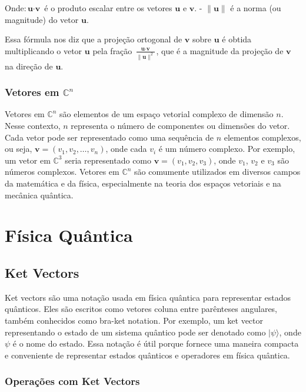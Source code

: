 \documentclass[12pt]{article}
\begin{document}
Onde:\(\textbf{u}  \cdot  \textbf{v} \) é o produto escalar entre os vetores \( \textbf{u} \) e \( \textbf{v} \).
- \( \| \textbf{u} \| \) é a norma (ou magnitude) do vetor \( \textbf{u} \).

Essa fórmula nos diz que a projeção ortogonal de \( \textbf{v} \) sobre \( \textbf{u} \) é obtida multiplicando o vetor \( \textbf{u} \) pela fração \(\frac{\textbf{u} \cdot \textbf{v}}{\|\textbf{u}\|^2}\), que é a magnitude da projeção de \(\textbf{v} \) na direção de \(\textbf{u}\).

\subsubsection{Vetores em $\mathbb{C}^n$}

Vetores em $\mathbb{C}^n$ são elementos de um espaço vetorial complexo de dimensão $n$. Nesse contexto, $n$ representa o número de componentes ou dimensões do vetor. Cada vetor pode ser representado como uma sequência de $n$ elementos complexos, ou seja, $\textbf{v} = (v_1, v_2, \ldots, v_n)$, onde cada $v_i$ é um número complexo. Por exemplo, um vetor em $\mathbb{C}^3$ seria representado como $\textbf{v} = (v_1, v_2, v_3)$, onde $v_1$, $v_2$ e $v_3$ são números complexos. Vetores em $\mathbb{C}^n$ são comumente utilizados em diversos campos da matemática e da física, especialmente na teoria dos espaços vetoriais e na mecânica quântica.

\newpage
\section{Física Quântica}

\subsection{Ket Vectors}


Ket vectors são uma notação usada em física quântica para representar estados quânticos. Eles são escritos como vetores coluna entre parênteses angulares, também conhecidos como bra-ket notation. Por exemplo, um ket vector representando o estado de um sistema quântico pode ser denotado como $|\psi\rangle$, onde $\psi$ é o nome do estado. Essa notação é útil porque fornece uma maneira compacta e conveniente de representar estados quânticos e operadores em física quântica.

\subsubsection{Operações com Ket Vectors}
\end{document}

